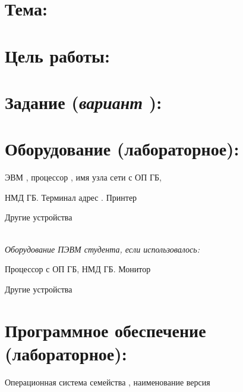 \section{Тема:}
\uline{\hfill} 

\section{Цель работы:}
\uline{ \hfill}  

\section{Задание (\textnormal{\itshape вариант \textnumero } ):}
 \uline{\hfill}

\section{Оборудование (лабораторное):} \hfill

ЭВМ \uline{\hspace{3cm}}, процессор \uline{\hspace{3cm}}, имя узла сети \uline{\hspace{3cm}} с ОП \uline{\hspace{2cm}} ГБ, 

НМД \uline{\hspace{2cm}} ГБ. Терминал \uline{\hspace{2cm}} адрес \uline{\hspace{3cm}} . Принтер \uline{\hfill}

Другие устройства \uline{\hfill}

\uline{\hfill}\\

\textit{Оборудование ПЭВМ студента, если использовалось:}

Процессор с \uline{\hspace{3cm}} ОП \uline{\hspace{2cm}} ГБ, НМД \uline{\hspace{2cm}} ГБ. Монитор \uline{\hfill}

Другие устройства \uline{\hfill}

\uline{\hfill}

\section{Программное обеспечение (лабораторное):} \hfill

Операционная система семейства \uline{\hspace{2cm}}, наименование \uline{\hspace{3cm}} версия \uline{\hfill}

